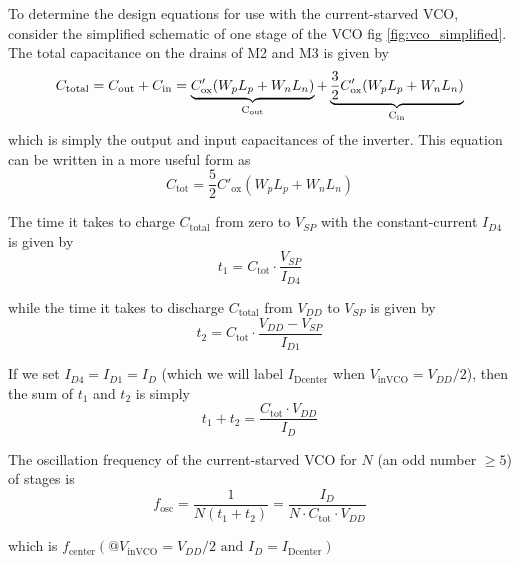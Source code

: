 To determine the design equations for use with the current-starved VCO, consider
the simplified schematic of one stage of the VCO fig \ref{fig:vco_simplified}. The total
capacitance on the drains of M2 and M3 is given by
\begin{equation}
	C_{\text{total}} = C_{\text{out}} + C_{\text{in}} = 
\underbrace{C'_{\text{ox}}(W_p L_p + W_n L_n)}_{\text{C\textsubscript{out}}} + 
\underbrace{\frac{3}{2} C'_{\text{ox}}(W_p L_p + W_n L_n)}_{\text{C\textsubscript{in}}}
\end{equation}
which is simply the output and input capacitances of the inverter. This equation can be written in a more useful form as
\begin{equation}
C_{\text{tot}} = \frac{5}{2} C'_{\text{ox}} (W_p L_p + W_n L_n)
\tag{19.19}
\end{equation}

\noindent The time it takes to charge $C_{\text{total}}$ from zero to $V_{SP}$ with the constant-current $I_{D4}$ is given by
\begin{equation}
t_1 = C_{\text{tot}} \cdot \frac{V_{SP}}{I_{D4}}
\tag{19.20}
\end{equation}

\noindent while the time it takes to discharge $C_{\text{total}}$ from $V_{DD}$ to $V_{SP}$ is given by
\begin{equation}
t_2 = C_{\text{tot}} \cdot \frac{V_{DD} - V_{SP}}{I_{D1}}
\tag{19.21}
\end{equation}

If we set $I_{D4} = I_{D1} = I_D$ (which we will label $I_{\text{Dcenter}}$ when $V_{\text{inVCO}} = V_{DD}/2$), then the sum of $t_1$ and $t_2$ is simply
\begin{equation}
t_1 + t_2 = \frac{C_{\text{tot}} \cdot V_{DD}}{I_D}
\tag{19.22}
\end{equation}

The oscillation frequency of the current-starved VCO for $N$ (an odd number $\geq 5$) of stages is
\begin{equation}
f_{\text{osc}} = \frac{1}{N(t_1 + t_2)} = \frac{I_D}{N \cdot C_{\text{tot}} \cdot V_{DD}}
\tag{19.23}
\end{equation}

which is $f_{\text{center}}(@ V_{\text{inVCO}} = V_{DD}/2 \text{ and } I_D = I_{\text{Dcenter}})$

